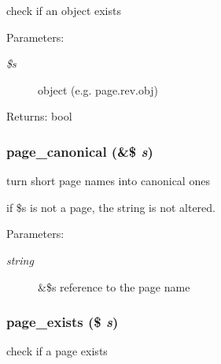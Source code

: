 check if an object exists

\begin{Desc}
\item[Parameters:]
\begin{description}
\item[{\em \$s}]object (e.g. page.rev.obj) \end{description}
\end{Desc}
\begin{Desc}
\item[Returns:]bool \end{Desc}
\hypertarget{common_8inc_8php_31ed04b0c90ac3077e71743c307d45f8}{
\subsubsection[{page\_\-canonical}]{\setlength{\rightskip}{0pt plus 5cm}page\_\-canonical (\&\$ {\em s})}}
\label{common_8inc_8php_31ed04b0c90ac3077e71743c307d45f8}


turn short page names into canonical ones

if \$s is not a page, the string is not altered. \begin{Desc}
\item[Parameters:]
\begin{description}
\item[{\em string}]\&\$s reference to the page name \end{description}
\end{Desc}
\hypertarget{common_8inc_8php_a71868111dd5b8af98df9cc9c968e523}{
\subsubsection[{page\_\-exists}]{\setlength{\rightskip}{0pt plus 5cm}page\_\-exists (\$ {\em s})}}
\label{common_8inc_8php_a71868111dd5b8af98df9cc9c968e523}


check if a page exists

